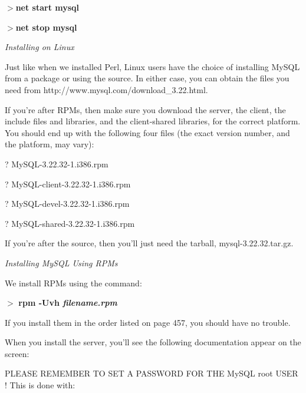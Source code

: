 \documentclass[a4paper,11pt]{book}
\begin{document}
\noindent 

\noindent $>$\textbf{net start mysql}

\noindent $>$\textbf{net stop mysql}

\noindent 

\noindent \textit{Installing on Linux}

\noindent Just like when we installed Perl, Linux users have the choice of installing MySQL from a package or using the source. In either case, you can obtain the files you need from http://www.mysql.com/download\_3.22.html.

\noindent 

\noindent If you're after RPMs, then make sure you download the server, the client, the include files and libraries, and the client-shared libraries, for the correct platform. You should end up with the following four files (the exact version number, and the platform, may vary):

\noindent 

\noindent ? MySQL-3.22.32-1.i386.rpm

\noindent 

\noindent ? MySQL-client-3.22.32-1.i386.rpm

\noindent 

\noindent ? MySQL-devel-3.22.32-1.i386.rpm

\noindent 

\noindent ? MySQL-shared-3.22.32-1.i386.rpm

\noindent 

\noindent If you're after the source, then you'll just need the tarball, mysql-3.22.32.tar.gz.

\noindent 

\noindent 

\noindent \textit{Installing MySQL Using RPMs}

\noindent We install RPMs using the command:

\noindent 

\noindent $>$ \textbf{rpm -Uvh \textit{filename.rpm}}

\noindent 

\noindent If you install them in the order listed on page 457, you should have no trouble.

\noindent 

\noindent When you install the server, you'll see the following documentation appear on the screen:

\noindent 

\noindent PLEASE REMEMBER TO SET A PASSWORD FOR THE MySQL root USER ! This is done with:
\end{document}
